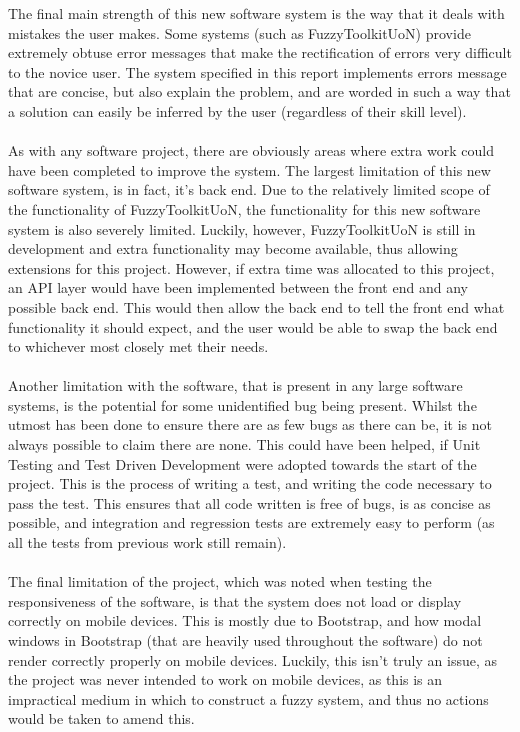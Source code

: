 The final main strength of this new software system is the way that it deals with mistakes the user makes. Some systems (such as FuzzyToolkitUoN) provide extremely obtuse error messages that make the rectification of errors very difficult to the novice user. The system specified in this report implements errors message that are concise, but also explain the problem, and are worded in such a way that a solution can easily be inferred by the user (regardless of their skill level).\ \\
\ \\
As with any software project, there are obviously areas where extra work could have been completed to improve the system. The largest limitation of this new software system, is in fact, it's back end. Due to the relatively limited scope of the functionality of FuzzyToolkitUoN, the functionality for this new software system is also severely limited. Luckily, however, FuzzyToolkitUoN is still in development and extra functionality may become available, thus allowing extensions for this project. However, if extra time was allocated to this project, an API layer would have been implemented between the front end and any possible back end. This would then allow the back end to tell the front end what functionality it should expect, and the user would be able to swap the back end to whichever most closely met their needs.\ \\
\ \\
Another limitation with the software, that is present in any large software systems, is the potential for some unidentified bug being present. Whilst the utmost has been done to ensure there are as few bugs as there can be, it is not always possible to claim there are none. This could have been helped, if Unit Testing and Test Driven Development were adopted towards the start of the project. This is the process of writing a test, and writing the code necessary to pass the test. This ensures that all code written is free of bugs, is as concise as possible, and integration and regression tests are extremely easy to perform\cite{olan2003unit} (as all the tests from previous work still remain).\ \\
\ \\
The final limitation of the project, which was noted when testing the responsiveness of the software, is that the system does not load or display correctly on mobile devices. This is mostly due to Bootstrap, and how modal windows in Bootstrap (that are heavily used throughout the software) do not render correctly properly on mobile devices. Luckily, this isn't truly an issue, as the project was never intended to work on mobile devices, as this is an impractical medium in which to construct a fuzzy system, and thus no actions would be taken to amend this.
